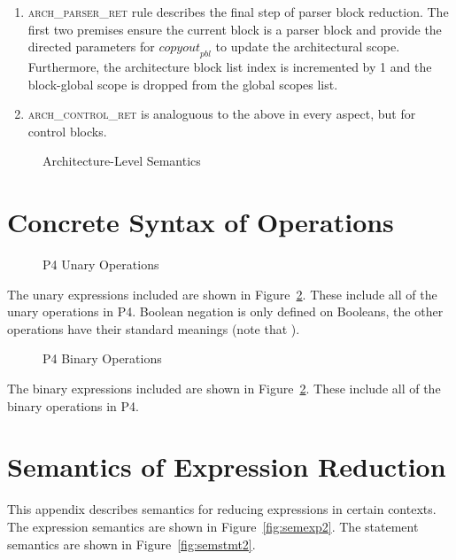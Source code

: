 \documentclass[UTF8]{article}
\begin{document}
\begin{enumerate}
\item \textsc{arch\_parser\_ret} rule describes the final step of parser block reduction. The first two premises ensure the current block is a parser block and provide the directed parameters for $\mathit{copyout}_{ \mathit{pbl} }$ to update the architectural scope. Furthermore, the architecture block list index is incremented by 1 and the block-global scope is dropped from the global scopes list.

\item \textsc{arch\_control\_ret} is analoguous to the above in every aspect, but for control blocks.
\end{enumerate}

\begin{figure}[ht!]
\resizebox{.75\linewidth}{!}{
\begin{minipage}{\linewidth}
\ottdefnsarchXXsem
\end{minipage}
}
\caption{Architecture-Level Semantics}
\label{fig:semarch}
\end{figure}


\clearpage
\appendix
\section{Concrete Syntax of Operations}
\label{app:op}
\begin{figure}[ht!]
\centering\ottgrammartabular{
\ottunop\ottafterlastrule
}
\caption{P4 Unary Operations}
\label{fig:unop}
\end{figure}

The unary expressions included are shown in Figure~\ref{fig:unop}. These include all of the unary operations in P4. Boolean negation is only defined on Booleans, the other operations have their standard meanings (note that ).

\newpage
\begin{figure}[ht!]
\centering\ottgrammartabular{
\ottbinop\ottafterlastrule
}
\caption{P4 Binary Operations}
\label{fig:binop}
\end{figure}

The binary expressions included are shown in Figure~\ref{fig:unop}. These include all of the binary operations in P4.

\section{Semantics of Expression Reduction}
\label{app:exp}
This appendix describes semantics for reducing expressions in certain contexts. The expression semantics are shown in Figure~\ref{fig:semexp2}. The statement semantics are shown in Figure~\ref{fig:semstmt2}.
\end{document}
